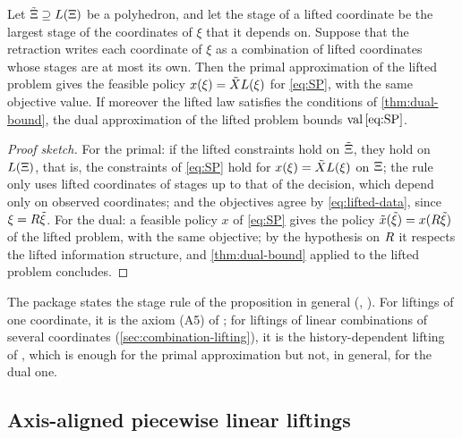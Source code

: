 \begin{proposition}
\label{prop:lifted}
Let $\tilde\Xi \supseteq L(\Xi)$ be a polyhedron, and let the stage of a lifted coordinate be the largest stage of the coordinates of $\xi$ that it depends on.
Suppose that the retraction writes each coordinate of $\xi$ as a combination of lifted coordinates whose stages are at most its own.
Then the primal approximation of the lifted problem
gives the feasible policy $x(\xi) = \tilde XL(\xi)$ for \eqref{eq:SP},
with the same objective value.
If moreover the lifted law satisfies the conditions of \cref{thm:dual-bound},
the dual approximation of the lifted problem bounds $\operatorname{val}\eqref{eq:SP}$.
\end{proposition}

\begin{proof}[Proof sketch]
For the primal: if the lifted constraints hold on $\tilde\Xi$, they hold on $L(\Xi)$, that is, the constraints of \eqref{eq:SP} hold for $x(\xi) = \tilde XL(\xi)$ on $\Xi$;
the rule only uses lifted coordinates of stages up to that of the decision, which depend only on observed coordinates;
and the objectives agree by \eqref{eq:lifted-data}, since $\xi = R\tilde\xi$.
For the dual: a feasible policy $x$ of \eqref{eq:SP} gives the policy $\tilde x(\tilde\xi) = x(R\tilde\xi)$ of the lifted problem, with the same objective;
by the hypothesis on $R$ it respects the lifted information structure, and \cref{thm:dual-bound} applied to the lifted problem concludes.
\end{proof}

The package states the stage rule of the proposition in general (, ).
For liftings of one coordinate, it is the axiom (A5) of \citet{GWK2015};
for liftings of linear combinations of several coordinates (\cref{sec:combination-lifting}), it is the history-dependent lifting of \citet[Remark~6.5]{GWK2015},
which is enough for the primal approximation but not, in general, for the dual one.

\subsection{Axis-aligned piecewise linear liftings}
\label{sec:axis-lifting}

